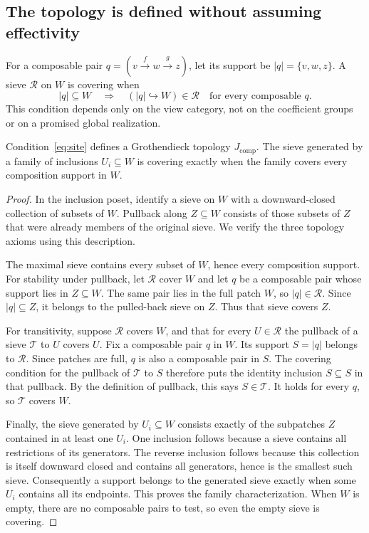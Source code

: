 \subsection{The topology is defined without assuming effectivity}
For a composable pair \(q=(v\xrightarrow f w\xrightarrow g z)\), let its support be \(|q|=\{v,w,z\}\). A sieve \(\mathcal R\) on \(W\) is covering when
\begin{equation}\label{eq:site}
 |q|\subseteq W\quad\Longrightarrow\quad
 (|q|\hookrightarrow W)\in\mathcal R
 \quad\text{for every composable }q.
\end{equation}
This condition depends only on the view category, not on the coefficient groups or on a promised global realization.

\begin{proposition}\label{KS35}
Condition~\eqref{eq:site} defines a Grothendieck topology \(J_{\mathrm{comp}}\). The sieve generated by a family of inclusions \(U_i\subseteq W\) is covering exactly when the family covers every composition support in \(W\).
\end{proposition}
\begin{proof}
In the inclusion poset, identify a sieve on $W$ with a downward-closed collection of subsets of $W$. Pullback along $Z\subseteq W$ consists of those subsets of $Z$ that were already members of the original sieve. We verify the three topology axioms using this description.

The maximal sieve contains every subset of $W$, hence every composition support. For stability under pullback, let $\mathcal R$ cover $W$ and let $q$ be a composable pair whose support lies in $Z\subseteq W$. The same pair lies in the full patch $W$, so $|q|\in\mathcal R$. Since $|q|\subseteq Z$, it belongs to the pulled-back sieve on $Z$. Thus that sieve covers $Z$.

For transitivity, suppose $\mathcal R$ covers $W$, and that for every $U\in\mathcal R$ the pullback of a sieve $\mathcal T$ to $U$ covers $U$. Fix a composable pair $q$ in $W$. Its support $S=|q|$ belongs to $\mathcal R$. Since patches are full, $q$ is also a composable pair in $S$. The covering condition for the pullback of $\mathcal T$ to $S$ therefore puts the identity inclusion $S\subseteq S$ in that pullback. By the definition of pullback, this says $S\in\mathcal T$. It holds for every $q$, so $\mathcal T$ covers $W$.

Finally, the sieve generated by $U_i\subseteq W$ consists exactly of the subpatches $Z$ contained in at least one $U_i$. One inclusion follows because a sieve contains all restrictions of its generators. The reverse inclusion follows because this collection is itself downward closed and contains all generators, hence is the smallest such sieve. Consequently a support belongs to the generated sieve exactly when some $U_i$ contains all its endpoints. This proves the family characterization. When $W$ is empty, there are no composable pairs to test, so even the empty sieve is covering.
\end{proof}
